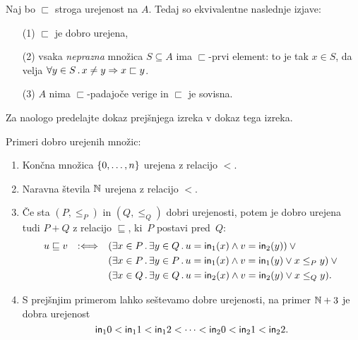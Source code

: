 \begin{izrek}
  Naj bo $\sqsubset$ stroga urejenost na $A$. Tedaj so ekvivalentne naslednje izjave:
  \begin{enumerate}
  \item[(1)] $\sqsubset$ je dobro urejena,
  \item[(2)] vsaka \emph{neprazna} množica $S \subseteq A$ ima $\sqsubset$-prvi element: to je tak $x \in S$, da velja
    $\forall y \in S \,.\, x \neq y \Rightarrow x \sqsubset y$.
  \item[(3)] $A$ nima $\sqsubset$-padajoče verige in $\sqsubset$ je sovisna.
  \end{enumerate}
\end{izrek}

\begin{dokaz}
  Za naologo predelajte dokaz prejšnjega izreka v dokaz tega izreka.
\end{dokaz}

\begin{primer}
  Primeri dobro urejenih množic:
  \begin{enumerate}
  \item Končna množica $\left\{0, \ldots, n\right\}$ urejena z relacijo $<$.

  \item Naravna števila $\mathbb{N}$ urejena z relacijo $<$.

  \item Če sta $(P, \leq_P)$ in $(Q, \leq_Q)$ dobri urejenosti, potem je dobro urejena tudi $P + Q$ z relacijo
    $\sqsubseteq$, ki~$P$ postavi pred~$Q$:
    \begin{equation*}
      u \sqsubseteq v \quad {{:}{\Longleftrightarrow}}\quad
      \begin{aligned}[t]
        &(\exists x \in P \,.\, \exists y \in Q \,.\, u = \mathsf{in}_{1}(x) \land v = \mathsf{in}_{2}(y)) \lor {}\\
        &(\exists x \in P \,.\, \exists y \in P \,.\, u = \mathsf{in}_{1}(x) \land v = \mathsf{in}_{1}(y) \lor x \leq_P y) \lor {}\\
        &(\exists x \in Q \,.\, \exists y \in Q \,.\, u = \mathsf{in}_{2}(x) \land v = \mathsf{in}_{2}(y) \lor x \leq_Q y).
      \end{aligned}
    \end{equation*}

  \item
    S prejšnjim primerom lahko seštevamo dobre urejenosti, na primer $\mathbb{N} + 3$ je dobra
    urejenost
    \begin{equation*}
      \mathsf{in}_{1}{0} < \mathsf{in}_{1}{1} < \mathsf{in}_{1}{2} < \cdots < \mathsf{in}_{2}{0} < \mathsf{in}_{2}{1} < \mathsf{in}_{2}{2}.
    \end{equation*}
  \end{enumerate}
\end{primer}